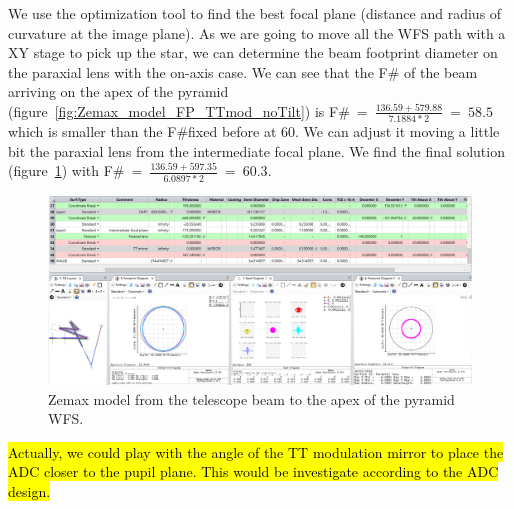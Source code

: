 \documentclass[12pt,a4paper]{article}
\begin{document}
We use the optimization tool to find the best focal plane (distance and radius of curvature at the image plane). As we are going to move all the WFS path with a XY stage to pick up the star, we can determine the beam footprint diameter on the paraxial lens with the on-axis case. We can see that the F\# of the beam arriving on the apex of the pyramid (figure~\ref{fig:Zemax_model_FP_TTmod_noTilt}) is F\#$~=~\frac{136.59+579.88}{7.1884*2}~=~58.5$ which is smaller than the F\#fixed before at 60. We can adjust it moving a little bit the paraxial lens from the intermediate focal plane. We find the final solution (figure~\ref{fig:Zemax_model_FP_ApexPyr}) with F\#$~=~\frac{136.59+597.35}{6.0897*2}~=~60.3$.\\
\begin{figure}[H]
	\begin{center}
		\includegraphics[width=\textwidth]{images/Zemax_model_FP_ApexPyr.PNG}
		\caption{Zemax model from the telescope beam to the apex of the pyramid WFS.}\label{fig:Zemax_model_FP_ApexPyr}
	\end{center}
\end{figure}

\hl{Actually, we could play with the angle of the TT modulation mirror to place the ADC closer to the pupil plane. This would be investigate according to the ADC design.}
\end{document}
